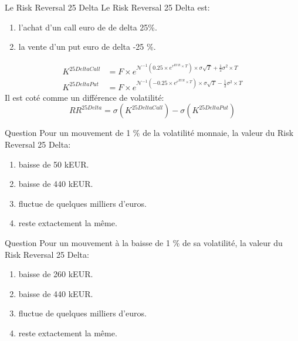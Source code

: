 \documentclass{beamer}
\begin{document}
\begin{frame}{Le Risk Reversal 25 Delta}
Le Risk Reversal 25 Delta est:\\
\begin{enumerate}
\item l'achat d'un call euro de de delta 25\%.\\
\item la vente d'un put euro de delta -25 \%.
\end{enumerate}
\Large
\begin{align*}
K^{25 Delta Call}&=F\times e^{\mathcal{N}^{-1}(0.25 \times e^{r^{EUR}\times T})\times \sigma \sqrt{T} +\frac{1}{2}\sigma^2 \times T }\\
K^{25 Delta Put}&=F\times e^{\mathcal{N}^{-1}(-0.25 \times e^{r^{EUR}\times T})\times \sigma \sqrt{T} -\frac{1}{2}\sigma^2 \times T }
\end{align*}
\normalsize
Il est coté comme un différence de volatilité:\\
\[
	RR^{25 Delta}=\sigma(K^{25 Delta Call})-\sigma(K^{25 Delta Put})
\]
\end{frame}


\begin{frame}{Question}
Pour un mouvement de 1 \% de la volatilité monnaie, la valeur du Risk Reversal 25 Delta:\\
\begin{enumerate}
\item baisse de 50 kEUR.
\item baisse de 440 kEUR.
\item fluctue de quelques milliers d'euros.
\item reste extactement la même. 
\end{enumerate}
\end{frame}

\begin{frame}{Question}
Pour un mouvement à la baisse de 1 \% de sa volatilité, la valeur du Risk Reversal 25 Delta:\\
\begin{enumerate}
\item baisse de 260 kEUR.
\item baisse de 440 kEUR.
\item fluctue de quelques milliers d'euros.
\item reste extactement la même.
\end{enumerate}
 
\end{frame}
\end{document}
